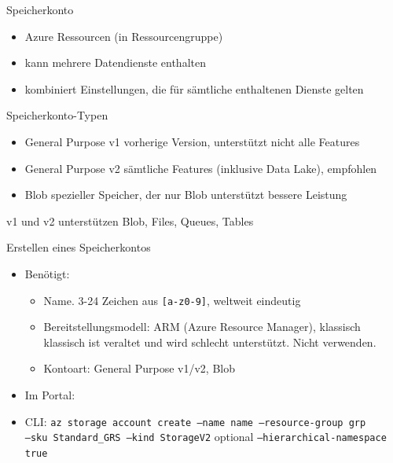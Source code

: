 \begin{flashcard}[Definition]{Speicherkonto}
    \begin{itemize}
        \item Azure Ressourcen (in Ressourcengruppe)
        \item kann mehrere Datendienste enthalten
        \item kombiniert Einstellungen, die für sämtliche enthaltenen Dienste gelten
    \end{itemize}
\end{flashcard}

\begin{flashcard}[Definition]{Speicherkonto-Typen}
    \begin{itemize}
        \item General Purpose v1\newline
            vorherige Version, unterstützt nicht alle Features
        \item General Purpose v2\newline
            sämtliche Features (inklusive Data Lake), empfohlen
        \item Blob\newline
            spezieller Speicher, der nur Blob unterstützt\newline
            bessere Leistung
    \end{itemize}
    v1 und v2 unterstützen Blob, Files, Queues, Tables
\end{flashcard}

\begin{flashcard}[Definition]{Erstellen eines Speicherkontos}
    \begin{itemize}
        \item Benötigt:
            \begin{itemize}
                \item Name. 3-24 Zeichen aus \texttt{[a-z0-9]}, weltweit eindeutig
                \item Bereitstellungsmodell: ARM (Azure Resource Manager), klassisch\newline
                klassisch ist veraltet und wird schlecht unterstützt. Nicht verwenden.
                \item Kontoart: General Purpose v1/v2, Blob
            \end{itemize}
        \item Im Portal:
        \item CLI: \texttt{az storage account create --name name --resource-group grp\\ --sku Standard\_GRS --kind StorageV2}
    optional \texttt{--hierarchical-namespace true}
    \end{itemize}
\end{flashcard}

